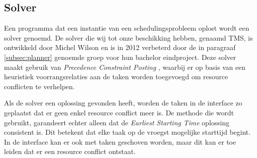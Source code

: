 \subsection{Solver}
\label{subsec:solver}

Een programma dat een instantie van een schedulingsprobleem oplost wordt een solver genoemd. De solver die wij tot onze beschikking hebben, genaamd TMS, is ontwikkeld door Michel Wilson en is in 2012 verbeterd door de in paragraaf \ref{subsec:planner} genoemde groep voor hun bachelor eindproject. Deze solver maakt gebruik van \emph{Precedence Constraint Posting} \cite{seminarium2014}, waarbij er op basis van een heuristiek voorrangsrelaties aan de taken worden toegevoegd om resource conflicten te verhelpen.

Als de solver een oplossing gevonden heeft, worden de taken in de interface zo geplaatst dat er geen enkel resource conflict meer is. De methode die wordt gebruikt, garandeert echter alleen dat de \emph{Earliest Starting Time} oplossing consistent is. Dit betekent dat elke taak op de vroegst mogelijke starttijd begint. In de interface kan er ook met taken geschoven worden, maar dit kan er toe leiden dat er een resource conflict ontstaat. 
